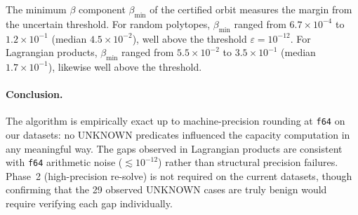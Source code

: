 The minimum $\beta$ component $\beta_{\min}$ of the certified orbit measures
the margin from the uncertain threshold.
For random polytopes, $\beta_{\min}$ ranged from $6.7 \times 10^{-4}$
to $1.2 \times 10^{-1}$ (median $4.5 \times 10^{-2}$), well above the
threshold $\varepsilon = 10^{-12}$.
For Lagrangian products, $\beta_{\min}$ ranged from $5.5 \times 10^{-2}$
to $3.5 \times 10^{-1}$ (median $1.7 \times 10^{-1}$), likewise well above
the threshold.

\paragraph{Conclusion.}
The algorithm is empirically exact up to machine-precision rounding at
\texttt{f64} on our datasets: no UNKNOWN predicates influenced the capacity
computation in any meaningful way.
The gaps observed in Lagrangian products are consistent with \texttt{f64}
arithmetic noise ($\lesssim 10^{-12}$) rather than structural precision
failures.
Phase~2 (high-precision re-solve) is not required on the current datasets,
though confirming that the 29 observed UNKNOWN cases are truly benign would
require verifying each gap individually.
